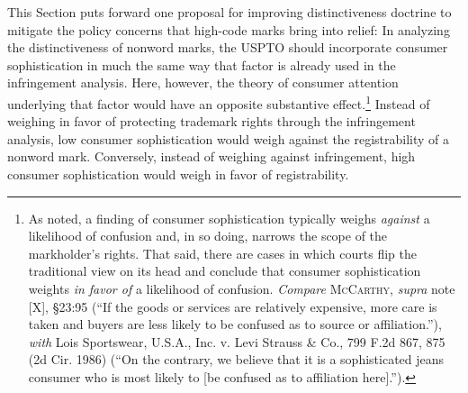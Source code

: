 \documentclass[letterpaper, 11pt, oneside]{article}
\begin{document}
This Section puts forward one proposal for improving distinctiveness doctrine to mitigate the policy concerns that high-code marks bring into relief: In analyzing the distinctiveness of nonword marks, the USPTO should incorporate consumer sophistication in much the same way that factor is already used in the infringement analysis. Here, however, the theory of consumer attention underlying that factor would have an opposite substantive effect.\footnote{As noted, a finding of consumer sophistication typically weighs \textit{against} a likelihood of confusion and, in so doing, narrows the scope of the markholder's rights. That said, there are cases in which courts flip the traditional view on its head and conclude that consumer sophistication weights \textit{in favor of} a likelihood of confusion. \textit{Compare} \textsc{McCarthy}, \textit{supra} note [X], \S 23:95 (``If the goods or services are relatively expensive, more care is taken and buyers are less likely to be confused as to source or affiliation.''), \textit{with} Lois Sportswear, U.S.A., Inc. v. Levi Strauss \& Co., 799 F.2d 867, 875 (2d Cir. 1986) (``On the contrary, we believe that it is a sophisticated jeans consumer who is most likely to [be confused as to affiliation here].'').} Instead of weighing in favor of protecting trademark rights through the infringement analysis, low consumer sophistication would weigh against the registrability of a nonword mark. Conversely, instead of weighing against infringement, high consumer sophistication would weigh in favor of registrability.
\end{document}
